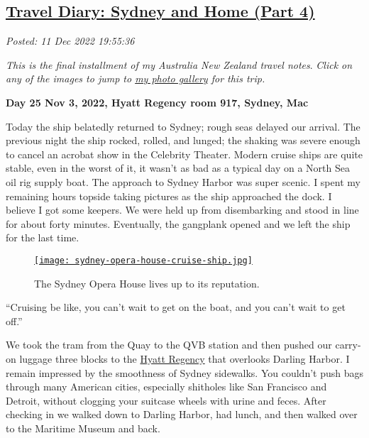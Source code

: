 %

\subsection*{\href{https://analyzethedatanotthedrivel.org/2022/12/11/travel-diary-sydney-and-home-part-4/}{Travel Diary: Sydney and Home (Part 4)}}


\noindent\emph{Posted: 11 Dec 2022 19:55:36}
\vspace{6pt}

\emph{This is the final installment of my Australia New Zealand travel
notes}. \emph{Click on any of the images to jump to
\href{https://conceptcontrol.smugmug.com/Trips/Overseas/Australia-New-Zealand-2022/}{my
photo gallery} for this trip.}


\textbf{Day 25 Nov 3, 2022, Hyatt Regency room 917, Sydney, Mac}

Today the ship belatedly returned to Sydney; rough seas delayed our
arrival. The previous night the ship rocked, rolled, and lunged; the
shaking was severe enough to cancel an acrobat show in the Celebrity
Theater. Modern cruise ships are quite stable, even in the worst of it,
it wasn't as bad as a typical day on a North Sea oil rig supply boat.
The approach to Sydney Harbor was super scenic. I spent my remaining
hours topside taking pictures as the ship approached the dock. I believe
I got some keepers. We were held up from disembarking and stood in line
for about forty minutes. Eventually, the gangplank opened and we left
the ship for the last time.


\captionsetup[figure]{labelformat=empty}
\begin{figure}[htbp]
\centering
\href{https://conceptcontrol.smugmug.com/Trips/Overseas/Australia-New-Zealand-2022/i-8DNHGRR/A}{\texttt{[image: sydney-opera-house-cruise-ship.jpg]}}
\caption{The Sydney Opera House lives up to its reputation.}
\label{fig:7627x0}
\end{figure}
 

``Cruising be like, you can't wait to get on the boat, and you can't
wait to get off.''

We took the tram from the Quay to the QVB station and then pushed our
carry-on luggage three blocks to the \href{https://www.hyatt.com/en-US/hotel/australia/hyatt-regency-sydney/sydrs}{Hyatt Regency} that overlooks
Darling Harbor. I remain impressed by the smoothness of Sydney
sidewalks. You couldn't push bags through many American cities,
especially shitholes like San Francisco and Detroit, without clogging
your suitcase wheels with urine and feces. After checking in we walked
down to Darling Harbor, had lunch, and then walked over to the Maritime
Museum and back.

